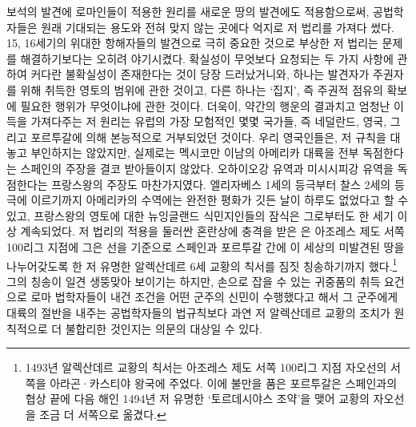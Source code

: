 보석의 발견에 로마인들이 적용한 원리를 새로운 땅의 발견에도 적용함으로써,
공법학자들은
원래 기대되는 용도와 전혀 맞지 않는 곳에다 억지로
저 법리를
가져다 썼다.
15, 16세기의 위대한 항해자들의 발견으로 극히 중요한 것으로 부상한
저 법리는
문제를 해결하기보다는 오히려 야기시켰다.
확실성이 무엇보다 요청되는 두 가지 사항에 관하여
커다란 불확실성이 존재한다는 것이 당장 드러났거니와,
하나는 발견자가 주권자를 위해 취득한 영토의 범위에 관한 것이고,
다른 하나는 `집지',
즉 주권적 점유의 확보에
필요한 행위가 무엇이냐에
관한 것이다.
더욱이,
약간의 행운의 결과치고 엄청난 이득을 가져다주는 저 원리는
유럽의 가장 모험적인 몇몇 국가들, 즉 네덜란드, 영국, 그리고 포르투갈에 의해
본능적으로 거부되었던 것이다.
우리 영국인들은,
저  규칙을 대놓고 부인하지는 않았지만,
실제로는
멕시코만 이남의 아메리카 대륙을 전부 독점한다는 스페인의 주장을
결코 받아들이지 않았다.
오하이오강 유역과 미시시피강 유역을 독점한다는 프랑스왕의 주장도 마찬가지였다.
엘리자베스 1세의 등극부터 찰스 2세의 등극에 이르기까지
아메리카의 수역에는 완전한 평화가 깃든 날이
하루도 없었다고 할 수 있고,
프랑스왕의 영토에 대한
뉴잉글랜드 식민지인들의
잠식은
그로부터도 한 세기 이상 계속되었다.
저 법리의 적용을 둘러싼 혼란상에 충격을 받은 은
아조레스 제도 서쪽 100리그 지점에 그은 선을 기준으로
스페인과 포르투갈 간에
이 세상의 미발견된 땅을
나누어갖도록 한
저 유명한 알렉산데르 6세 교황의 칙서를 짐짓 칭송하기까지 했다.\footnote{%
  1493년 알렉산데르 교황의 칙서는
  아조레스 제도 서쪽 100리그 지점 자오선의 서쪽을
  아라곤^^b7카스티야 왕국에 주었다.
  이에 불만을 품은 포르투갈은 스페인과의 협상 끝에
  다음 해인 1494년 저 유명한 `토르데시야스 조약'을 맺어
  교황의 자오선을 조금 더 서쪽으로 옮겼다.
  }
그의 칭송이 일견 생뚱맞아 보이기는 하지만,
손으로 잡을 수 있는 귀중품의 취득 요건으로
로마 법학자들이 내건 조건을
어떤 군주의 신민이
수행했다고 해서 그 군주에게
대륙의 절반을 내주는 공법학자들의 법규칙보다
과연
저 알렉산데르 교황의 조치가
원칙적으로 더 불합리한 것인지는 의문의 대상일 수 있다.

